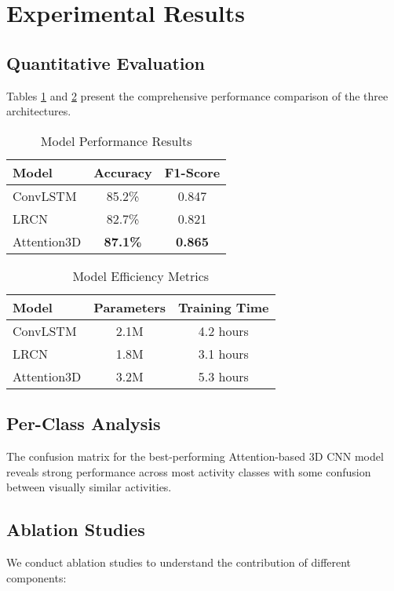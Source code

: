\documentclass[twocolumn]{article}
\begin{document}
\section{Experimental Results}

\subsection{Quantitative Evaluation}
Tables \ref{tab:performance} and \ref{tab:efficiency} present the comprehensive performance comparison of the three architectures.

\begin{table}[H]
\centering
\caption{Model Performance Results}
\label{tab:performance}
\begin{tabular}{@{}lcc@{}}
\toprule
\textbf{Model} & \textbf{Accuracy} & \textbf{F1-Score} \\
\midrule
ConvLSTM & 85.2\% & 0.847 \\
LRCN & 82.7\% & 0.821 \\
Attention3D & \textbf{87.1\%} & \textbf{0.865} \\
\bottomrule
\end{tabular}
\end{table}

\begin{table}[H]
\centering
\caption{Model Efficiency Metrics}
\label{tab:efficiency}
\begin{tabular}{@{}lcc@{}}
\toprule
\textbf{Model} & \textbf{Parameters} & \textbf{Training Time} \\
\midrule
ConvLSTM & 2.1M & 4.2 hours \\
LRCN & 1.8M & 3.1 hours \\
Attention3D & 3.2M & 5.3 hours \\
\bottomrule
\end{tabular}
\end{table}

\subsection{Per-Class Analysis}
The confusion matrix for the best-performing Attention-based 3D CNN model reveals strong performance across most activity classes with some confusion between visually similar activities.

\subsection{Ablation Studies}
We conduct ablation studies to understand the contribution of different components:
\end{document}
